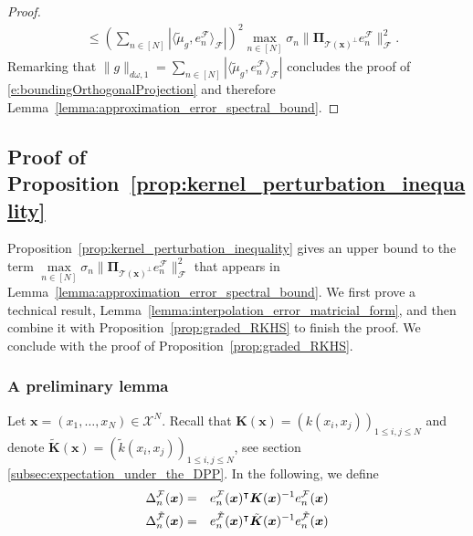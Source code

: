 \documentclass[twoside,11pt]{book}
\numberwithin{theorem}{chapter}
\numberwithin{definition}{chapter}
\numberwithin{proposition}{chapter}
\numberwithin{corollary}{chapter}
\numberwithin{example}{chapter}
\numberwithin{lemma}{chapter}
\numberwithin{assumption}{chapter}
\numberwithin{equation}{chapter}
\numberwithin{figure}{chapter}
\DeclareMathOperator{\Tran}{\intercal}
\newcommand{\pc}[1]{\textcolor{blue}{#1}}
\begin{document}
\begin{proof}
\begin{align}
    & \leq \left( \sum\limits_{n \in [N]} |\langle \tilde{\mu}_{g}, e_{n}^{\mathcal{F}} \rangle_{\mathcal{F}}| \right)^{2} \max\limits_{n \in [N]}\sigma_{n}  \|\bm{\Pi}_{\mathcal{T}(\bm{x})^{\perp}}e_{n}^{\mathcal{F}}\|_{\mathcal{F}}^{2} .
\end{align}
%
Remarking that
$ \|g \|_{d\omega,1} = \sum\limits_{n \in [N]} |\langle \tilde{\mu}_{g}, e_{n}^{\mathcal{F}} \rangle_{\mathcal{F}}|
$
concludes the proof of \eqref{e:boundingOrthogonalProjection} and therefore Lemma~\ref{lemma:approximation_error_spectral_bound}.
\end{proof}


\subsection{Proof of Proposition~\ref{prop:kernel_perturbation_inequality}}
\label{s:proofOfPerturbationInequality}
Proposition~\ref{prop:kernel_perturbation_inequality} gives an upper bound to the term $\max\limits_{n \in [N]}\sigma_{n}  \|\bm{\Pi}_{\mathcal{T}(\bm{x})^{\perp}}e_{n}^{\mathcal{F}}\|_{\mathcal{F}}^{2}$ that appears in Lemma~\ref{lemma:approximation_error_spectral_bound}.
We first prove a technical result, Lemma~\ref{lemma:interpolation_error_matricial_form}, and then combine it with  Proposition~\ref{prop:graded_RKHS} to finish the proof. We conclude with the proof of Proposition~\ref{prop:graded_RKHS}.

%

\subsubsection{A preliminary lemma}

Let $\bm{x} = (x_{1}, \dots, x_{N}) \in \mathcal{X}^{N}$. Recall that $\bm{K}(\bm{x}) = (k(x_{i},x_{j}))_{1 \leq i,j \leq N}$ and denote $\tilde{\bm{K}}(\bm{x}) = (\tilde{k}(x_{i},x_{j}))_{1 \leq i,j \leq N}$, see section \ref{subsec:expectation_under_the_DPP}.
%
In the following, we define  %
\begin{eqnarray}
  \Delta_n^{\cal F}(\bm{x}) & = & e_{n}^{\mathcal{F}}(\bm{x})^{\Tran}\bm{K}(\bm{x})^{-1}e_{n}^{\mathcal{F}}(\bm{x})\\
  \Delta_n^{\tilde{\cal F}}(\bm{x}) & = & e_{n}^{\tilde{\mathcal{F}}}(\bm{x})^{\Tran}\tilde{\bm{K}}(\bm{x})^{-1}e_{n}^{\tilde{\mathcal{F}}}(\bm{x})
\end{eqnarray}
\end{document}
